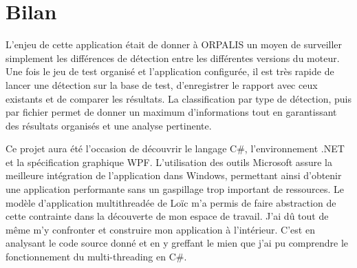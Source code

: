 \section{Bilan}

L'enjeu de cette application était de donner à ORPALIS un moyen de surveiller simplement les différences de détection entre les différentes versions du moteur. Une fois le jeu de test organisé et l'application configurée, il est très rapide de lancer une détection sur la base de test, d'enregistrer le rapport avec ceux existants et de comparer les résultats. La classification par type de détection, puis par fichier permet de donner un maximum d'informations tout en garantissant des résultats organisés et une analyse pertinente.

Ce projet aura été l'occasion de découvrir le langage C\#, l'environnement .NET et la spécification graphique WPF. L'utilisation des outils Microsoft assure la meilleure intégration de l'application dans Windows, permettant ainsi d'obtenir une application performante sans un gaspillage trop important de ressources. Le modèle d'application multithreadée de Loïc m'a permis de faire abstraction de cette contrainte dans la découverte de mon espace de travail. J'ai dû tout de même m'y confronter et construire mon application à l'intérieur. C'est en analysant le code source donné et en y greffant le mien que j'ai pu comprendre le fonctionnement du multi-threading en C\#.